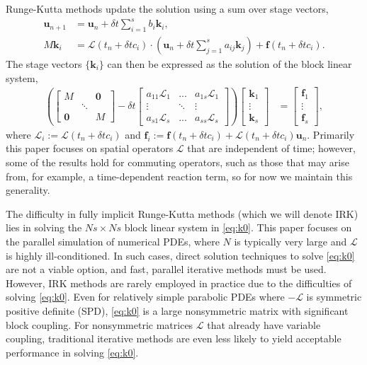 \documentclass[a4paper,10pt]{article}
\begin{document}
Runge-Kutta methods update the solution using a sum over stage vectors,
%
\begin{align}\label{eq:update}
\mathbf{u}_{n+1} & = \mathbf{u}_n + \delta t \sum_{i=1}^s b_i\mathbf{k}_i, \\
M\mathbf{k}_i & = \mathcal{L}(t_n+\delta tc_i)\cdot
	\left(\mathbf{u}_n + \delta t\sum_{j=1}^s a_{ij}\mathbf{k}_j\right) +
	\mathbf{f}(t_n+\delta tc_i).\label{eq:stages}
\end{align}
%
The stage vectors $\{\mathbf{k}_i\}$ can then be expressed as the solution of the block linear
system,
%
\begin{align}\label{eq:k0}
\left( \begin{bmatrix} M  & & \mathbf{0} \\ & \ddots \\ \mathbf{0} & & M\end{bmatrix}
	- \delta t \begin{bmatrix} a_{11}\mathcal{L}_1 & ... & a_{1s}\mathcal{L}_1 \\
	\vdots & \ddots & \vdots \\ a_{s1}\mathcal{L}_s & ... & a_{ss} \mathcal{L}_s \end{bmatrix} \right)
	\begin{bmatrix} \mathbf{k}_1 \\ \vdots \\ \mathbf{k}_s \end{bmatrix}
& = \begin{bmatrix} \mathbf{f}_1 \\ \vdots \\ \mathbf{f}_s \end{bmatrix},
\end{align}
%
where $\mathcal{L}_i := \mathcal{L}(t_n+\delta tc_i)$ and $\mathbf{f}_i :=
\mathbf{f}(t_n+\delta tc_i) + \mathcal{L}(t_n+\delta tc_i)\mathbf{u}_n$. Primarily this paper
focuses on spatial operators $\mathcal{L}$ that are independent of time; however, some of
the results hold for commuting operators, such as those that may arise from, for example,
a time-dependent reaction term, so for now we maintain this generality.

The difficulty in fully implicit Runge-Kutta methods (which we will denote IRK) lies in
solving the $Ns\times Ns$ block linear system in \eqref{eq:k0}. This paper focuses on the
parallel simulation of numerical PDEs, where $N$ is typically very large
and $\mathcal{L}$ is highly ill-conditioned. In such cases, direct
solution techniques to solve \eqref{eq:k0} are not a viable option, and fast, parallel
iterative methods must be used. However, IRK methods are rarely employed in practice due
to the difficulties of solving \eqref{eq:k0}. Even for relatively simple
parabolic PDEs where $-\mathcal{L}$ is symmetric positive definite (SPD), \eqref{eq:k0}
is a large nonsymmetric matrix with significant block coupling. For
nonsymmetric matrices $\mathcal{L}$ that already have variable coupling, traditional
iterative methods are even less likely to yield acceptable performance in solving
\eqref{eq:k0}.
\end{document}
